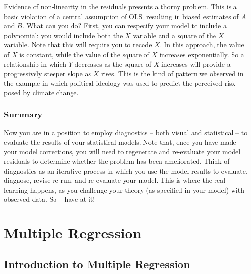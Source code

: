\documentclass[11pt,openany]{book}\usepackage[]{graphicx}\usepackage[]{color}
\begin{document}
{Evidence of non-linearity in the residuals presents a thorny problem. This is a basic violation of a central assumption of OLS, resulting in biased estimates of $A$ and $B$. What can you do? First, you can respecify your model to include a polynomial; you would include both the $X$ variable and a square of the $X$ variable. Note that this will require you to recode $X$. In this approach, the value of $X$ is constant, while the value of the square of $X$ increases exponentially. So a relationship in which $Y$ decreases as the square of $X$ increases will provide a progressively steeper slope as $X$ rises. This is the kind of pattern we observed in the example in which political ideology was used to predict the perceived risk posed by climate change.

\section{Summary} 

Now you are in a position to employ diagnostics -- both visual and statistical -- to evaluate the results of your statistical models. Note that, once you have made your model corrections, you will need to regenerate and re-evaluate your model residuals to determine whether the problem has been ameliorated. Think of diagnostics as an iterative process in which you use the model results to evaluate, diagnose, revise re-run, and re-evaluate your model. This is where the real learning happens, as you challenge your theory (as specified in your model) with observed data. So -- have at it!

\part{Multiple Regression} 




\chapter{Introduction to Multiple Regression}

}
\end{document}
